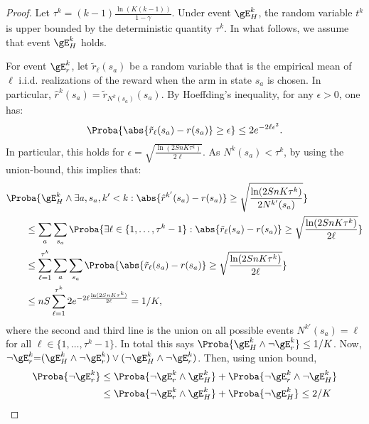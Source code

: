 \begin{subappendices}
\begin{proof}
    Let $\tau^k = (k-1)\frac{\ln(K(k-1))}{1-\gamma}$. Under event $\gE^{k}_H$, the random variable $t^k$ is upper bounded by the deterministic quantity $\tau^k$. In what follows, we assume that event $\gE^{k}_H$ holds.

    For event $\gE^{k}_r$, let $\tilde{r}_\ell(s_a)$ be a random variable that is the empirical mean of $\ell$ i.i.d. realizations of the reward when the arm in state $s_a$ is chosen. In particular, ${\hat{r}^{k}(s_a) = \tilde{r}_{N^{k}(s_a)}(s_a)}$. By Hoeffding's inequality, for any $\epsilon>0$, one has:
    \begin{align*}
        \Proba{\abs{\tilde{r}_\ell(s_a) - r(s_a)} \ge \epsilon  } \le 2 e^{-2 \ell\epsilon^2}.
    \end{align*}
    In particular, this holds for $\epsilon=\sqrt{\frac{\ln (2SnK\tau^k)}{2\ell}}$. As $N^{k}(s_a)< \tau^k$, by using the union-bound, this implies that: 
    \begin{align}
        &\Proba{\gE^{k}_H \land \exists a, s_a, k'< k: \abs{\hat{r}^{k'}(s_a) - r(s_a)} \ge \sqrt{\frac{\ln (2SnK\tau^k)}{2N^{k'}(s_a)}}}\label{eq:estR_k}\\
        &\qquad\le \sum_{a}\sum_{s_a}\Proba{\exists \ell\in\{1,\dots,\tau^k-1\}: \abs{\tilde{r}_{\ell}(s_a) - r(s_a)} \ge \sqrt{\frac{\ln (2SnK\tau^k)}{2\ell}}}\nonumber\\
        &\qquad\le \sum_{\ell=1}^{\tau^k}\sum_a\sum_{s_a}\Proba{\abs{\tilde{r}_{\ell}(s_a) - r(s_a)} \ge \sqrt{\frac{\ln (2SnK\tau^k)}{2\ell}}}\nonumber\\
        &\qquad\le  n S \sum_{\ell=1}^{\tau^k} 2e^{-2 \ell \frac{\ln (2SnK\tau^k)}{2\ell}} =1/K,\nonumber
    \end{align}
    where the second and third  line is the union on all possible events $N^{k'}(s_a){=}\ell$ for all ${\ell{\in}\{1,\dots, \tau^k-1\}}$.
    In total this says $\Proba{\gE^{k}_H\land \lnot \gE^{k}_r}\le 1/K$.
    Now, $\lnot \gE^{k}_r {=}(\gE^{k}_H \land \lnot \gE^{k}_r) \lor (\lnot \gE^{k}_H \land \lnot \gE^{k}_r)$.
    Then, using union bound,
    \begin{align*}
        \Proba{\lnot \gE^{k}_r}
        &\le \Proba{\lnot \gE^{k}_r \land \gE^{k}_H} + \Proba{\lnot \gE^{k}_r \land \lnot \gE^{k}_H} \\
        &\le \Proba{\lnot \gE^{k}_r \land \gE^{k}_H} + \Proba{\lnot \gE^{k}_H} \le 2/K
    \end{align*}


\end{proof}
\end{subappendices}

